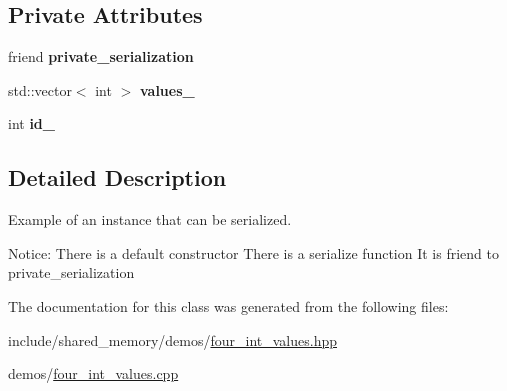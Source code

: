 \subsection*{Private Attributes}
\begin{DoxyCompactItemize}
\item 
friend {\bfseries private\+\_\+serialization}\hypertarget{classshared__memory_1_1Four__int__values_a692d60e4a7802cad45c215c65632e888}{}\label{classshared__memory_1_1Four__int__values_a692d60e4a7802cad45c215c65632e888}

\item 
std\+::vector$<$ int $>$ {\bfseries values\+\_\+}\hypertarget{classshared__memory_1_1Four__int__values_a253eba8afb24a1679013be704b224ea5}{}\label{classshared__memory_1_1Four__int__values_a253eba8afb24a1679013be704b224ea5}

\item 
int {\bfseries id\+\_\+}\hypertarget{classshared__memory_1_1Four__int__values_a2272823a3c672123c022851611640dd1}{}\label{classshared__memory_1_1Four__int__values_a2272823a3c672123c022851611640dd1}

\end{DoxyCompactItemize}


\subsection{Detailed Description}
Example of an instance that can be serialized. 

Notice\+: There is a default constructor There is a serialize function It is friend to private\+\_\+serialization 

The documentation for this class was generated from the following files\+:\begin{DoxyCompactItemize}
\item 
include/shared\+\_\+memory/demos/\hyperlink{four__int__values_8hpp}{four\+\_\+int\+\_\+values.\+hpp}\item 
demos/\hyperlink{four__int__values_8cpp}{four\+\_\+int\+\_\+values.\+cpp}\end{DoxyCompactItemize}
